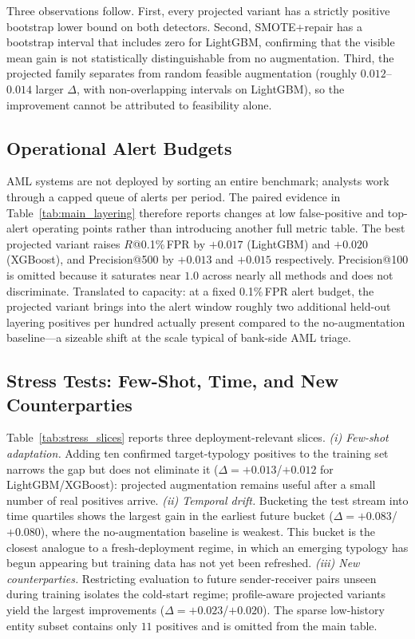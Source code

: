 \documentclass[sigconf,review,anonymous]{acmart}
\begin{document}
Three observations follow. First, every projected variant has a strictly
positive bootstrap lower bound on both detectors. Second, SMOTE+repair has a
bootstrap interval that includes zero for LightGBM, confirming that the
visible mean gain is not statistically distinguishable from no augmentation.
Third, the projected family separates from random feasible augmentation
(roughly $0.012$--$0.014$ larger $\Delta$, with non-overlapping intervals on
LightGBM), so the improvement cannot be attributed to feasibility alone.

\subsection{Operational Alert Budgets}
\label{subsec:alert_budget}

AML systems are not deployed by sorting an entire benchmark; analysts work
through a capped queue of alerts per period. The paired evidence in
Table~\ref{tab:main_layering} therefore reports changes at low false-positive
and top-alert operating points rather than introducing another full metric
table. The best projected variant raises $R$@0.1\%\,FPR by
$+0.017$ (LightGBM) and $+0.020$ (XGBoost), and Precision@500 by
$+0.013$ and $+0.015$ respectively. Precision@100 is omitted because it
saturates near $1.0$ across nearly all methods and does not discriminate.
Translated to capacity: at a fixed 0.1\%\,FPR alert budget, the projected
variant brings into the alert window roughly two additional held-out layering
positives per hundred actually present compared to the no-augmentation
baseline---a sizeable shift at the scale typical of bank-side AML triage.

\subsection{Stress Tests: Few-Shot, Time, and New Counterparties}
\label{subsec:robustness_slices}

Table~\ref{tab:stress_slices} reports three deployment-relevant slices.
\emph{(i) Few-shot adaptation.} Adding ten confirmed target-typology positives
to the training set narrows the gap but does not eliminate it
($\Delta{=}{+}0.013$/${+}0.012$ for LightGBM/XGBoost): projected augmentation
remains useful after a small number of real positives arrive.
\emph{(ii) Temporal drift.} Bucketing the test stream into time quartiles
shows the largest gain in the earliest future bucket
($\Delta{=}{+}0.083$/${+}0.080$), where the no-augmentation baseline is
weakest. This bucket is the closest analogue to a fresh-deployment regime, in
which an emerging typology has begun appearing but training data has not yet
been refreshed.
\emph{(iii) New counterparties.} Restricting evaluation to future
sender-receiver pairs unseen during training isolates the cold-start regime;
profile-aware projected variants yield the largest improvements
($\Delta{=}{+}0.023$/${+}0.020$). The sparse low-history entity subset
contains only $11$ positives and is omitted from the main table.
\end{document}
